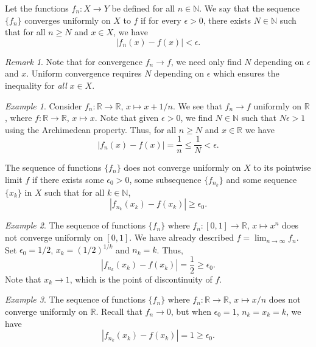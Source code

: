 \documentclass[11pt]{article}
\def\R{\mathbb{R}}
\def\N{\mathbb{N}}
\theoremstyle{definition}
\theoremstyle{remark}
\newtheorem*{remark}{Remark}
\newtheorem*{example}{Example}
\numberwithin{equation}{module}
\begin{document}
    \begin{definition}
        Let the functions $f_n\colon X \to Y$ be defined for all $n \in \N$.
        We say that the sequence $\{f_n\}$ converges uniformly on $X$ to $f$ if
        for every $\epsilon > 0$, there exists $N \in \N$ such that for all $n \geq
        N$ and $x \in X$, we have \[
            |f_n(x) - f(x)| < \epsilon.
        \] 
        \begin{remark}
            Note that for convergence $f_n \to f$, we need only find $N$
            depending on $\epsilon$ and $x$. Uniform convergence requires $N$
            depending on $\epsilon$ which ensures the inequality for \emph{all} 
            $x \in X$.
        \end{remark}
    \end{definition}
    \begin{example}
        Consider $f_n\colon \R \to \R$, $x \mapsto x + 1 /n$. We see that $f_n \to
        f$ uniformly on $\R$, where $f\colon \R \to \R$, $x \mapsto x$.
        Note that given $\epsilon > 0$, we find $N \in \N$ such that $N\epsilon >
        1$ using the Archimedean property. Thus, for all $n \geq N$ and $x \in \R$
        we have \[
            |f_n(x) - f(x)| = \frac{1}{n} \leq \frac{1}{N} < \epsilon.
        \] 
    \end{example}

    \begin{lemma}
        The sequence of functions $\{f_n\}$ does not converge uniformly on $X$ to
        its pointwise limit $f$ if there exists some $\epsilon_0 > 0$, some
        subsequence $\{f_{n_k}\}$ and some sequence $\{x_k\}$ in $X$ such that for
        all $k \in \N$, \[
            |f_{n_k}(x_k) - f(x_k)| \geq \epsilon_0.
        \] 
    \end{lemma}
    \begin{example}
        The sequence of functions $\{f_n\}$ where $f_n\colon [0, 1] \to \R$, $x
        \mapsto x^n$ does not converge uniformly on $[0, 1]$.
        We have already described $f = \lim_{n \to \infty} f_n$.
        Set $\epsilon_0 = 1 /2$, $x_k = (1 /2)^{1 /k}$ and $n_k = k$. Thus, \[
            |f_{n_k}(x_k) - f(x_k)| = \frac{1}{2} \geq \epsilon_0.
        \]
        Note that $x_k \to 1$, which is the point of discontinuity of $f$.
    \end{example}
    \begin{example}
        The sequence of functions $\{f_n\}$ where $f_n\colon \R \to \R$, $x \mapsto
        x /n$ does not converge uniformly on $\R$.
        Recall that $f_n \to 0$, but when $\epsilon_0 = 1$, $n_k = x_k = k$, we have
        \[
            |f_{n_k}(x_k) - f(x_k)| = 1 \geq \epsilon_0.
        \] 
    \end{example}
\end{document}
